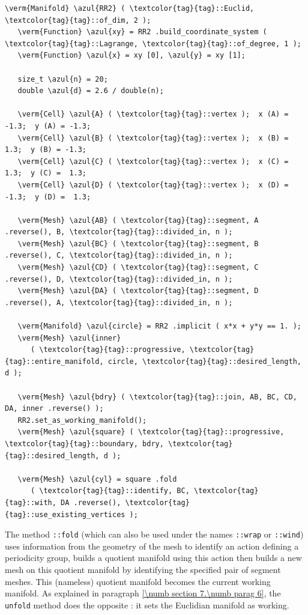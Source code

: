 \begin{Verbatim}[commandchars=\\\{\},formatcom=\small\tt,frame=single,
   label=parag-\ref{\numb section 7.\numb parag 16}.cpp,rulecolor=\color{coment},
   baselinestretch=0.94,framesep=2mm                                             ]
   \verm{Manifold} \azul{RR2} ( \textcolor{tag}{tag}::Euclid, \textcolor{tag}{tag}::of_dim, 2 );
   \verm{Function} \azul{xy} = RR2 .build_coordinate_system ( \textcolor{tag}{tag}::Lagrange, \textcolor{tag}{tag}::of_degree, 1 );
   \verm{Function} \azul{x} = xy [0], \azul{y} = xy [1];

   size_t \azul{n} = 20;
   double \azul{d} = 2.6 / double(n);

   \verm{Cell} \azul{A} ( \textcolor{tag}{tag}::vertex );  x (A) = -1.3;  y (A) = -1.3;
   \verm{Cell} \azul{B} ( \textcolor{tag}{tag}::vertex );  x (B) =  1.3;  y (B) = -1.3;
   \verm{Cell} \azul{C} ( \textcolor{tag}{tag}::vertex );  x (C) =  1.3;  y (C) =  1.3;
   \verm{Cell} \azul{D} ( \textcolor{tag}{tag}::vertex );  x (D) = -1.3;  y (D) =  1.3;

   \verm{Mesh} \azul{AB} ( \textcolor{tag}{tag}::segment, A .reverse(), B, \textcolor{tag}{tag}::divided_in, n );
   \verm{Mesh} \azul{BC} ( \textcolor{tag}{tag}::segment, B .reverse(), C, \textcolor{tag}{tag}::divided_in, n );
   \verm{Mesh} \azul{CD} ( \textcolor{tag}{tag}::segment, C .reverse(), D, \textcolor{tag}{tag}::divided_in, n );
   \verm{Mesh} \azul{DA} ( \textcolor{tag}{tag}::segment, D .reverse(), A, \textcolor{tag}{tag}::divided_in, n );

   \verm{Manifold} \azul{circle} = RR2 .implicit ( x*x + y*y == 1. );
   \verm{Mesh} \azul{inner}
      ( \textcolor{tag}{tag}::progressive, \textcolor{tag}{tag}::entire_manifold, circle, \textcolor{tag}{tag}::desired_length, d );

   \verm{Mesh} \azul{bdry} ( \textcolor{tag}{tag}::join, AB, BC, CD, DA, inner .reverse() );
   RR2.set_as_working_manifold();
   \verm{Mesh} \azul{square} ( \textcolor{tag}{tag}::progressive, \textcolor{tag}{tag}::boundary, bdry, \textcolor{tag}{tag}::desired_length, d );

   \verm{Mesh} \azul{cyl} = square .fold
      ( \textcolor{tag}{tag}::identify, BC, \textcolor{tag}{tag}::with, DA .reverse(), \textcolor{tag}{tag}::use_existing_vertices );
\end{Verbatim}

The method {\small\tt{}::fold} (which can also be used under the names
{\small\tt{}::wrap} or {\small\tt{}::wind}) uses information
from the geometry of the mesh to identify an action defining a periodicity group,
builds a quotient manifold using this action then builds a new mesh on this quotient manifold
by identifying the specified pair of segment meshes.
This (nameless) quotient manifold becomes the current working manifold.
As explained in paragraph \ref{\numb section 7.\numb parag 6}, the {\small\tt unfold} method
does the opposite : it sets the Euclidian manifold as working.

